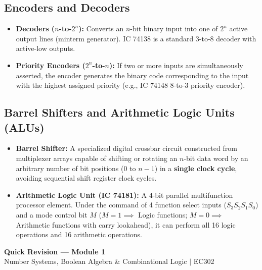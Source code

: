 \documentclass[12pt,a4paper]{article}
\begin{document}
\subsection{Encoders and Decoders}
\begin{itemize}[leftmargin=*, itemsep=3pt]
  \item \textbf{Decoders ($n$-to-$2^n$):} Converts an $n$-bit binary input into one of $2^n$ active output lines (minterm generator). IC 74138 is a standard 3-to-8 decoder with active-low outputs.
  \item \textbf{Priority Encoders ($2^n$-to-$n$):} If two or more inputs are simultaneously asserted, the encoder generates the binary code corresponding to the input with the highest assigned priority (e.g., IC 74148 8-to-3 priority encoder).
\end{itemize}

\subsection{Barrel Shifters and Arithmetic Logic Units (ALUs)}
\begin{itemize}[leftmargin=*, itemsep=3pt]
  \item \textbf{Barrel Shifter:} A specialized digital crossbar circuit constructed from multiplexer arrays capable of shifting or rotating an $n$-bit data word by an arbitrary number of bit positions ($0$ to $n-1$) in a \textbf{single clock cycle}, avoiding sequential shift register clock cycles.
  \item \textbf{Arithmetic Logic Unit (IC 74181):} A 4-bit parallel multifunction processor element. Under the command of 4 function select inputs ($S_3 S_2 S_1 S_0$) and a mode control bit $M$ ($M=1 \implies$ Logic functions; $M=0 \implies$ Arithmetic functions with carry lookahead), it can perform all 16 logic operations and 16 arithmetic operations.
\end{itemize}

\newpage
\begin{center}
  {\large\bfseries\color{myred} Quick Revision --- Module 1}\\[3pt]
  {\small\color{mydark} Number Systems, Boolean Algebra \& Combinational Logic $|$ EC302}
\end{center}
\noindent{\color{myred}\rule{\linewidth}{1.2pt}}
\vspace{4pt}
\end{document}
